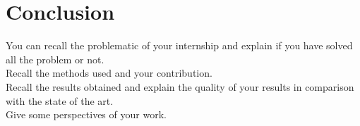 \chapter{Conclusion}


You can recall the problematic of your internship and explain if you have solved all the problem or not. \\

Recall the methods used and your contribution.\\

Recall the results obtained and explain the quality of your results in comparison with the state of the art.\\


Give some perspectives of your work.

